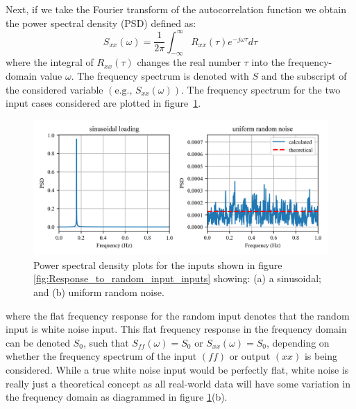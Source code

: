 \documentclass[12pt,letter]{article}
\numberwithin{ex}{section} %
\numberwithin{re}{section} %
\begin{document}
Next, if we take the Fourier transform of the autocorrelation function we obtain the power spectral density (PSD) defined as:
\begin{equation}
S_{xx}(\omega) =\frac{1}{2 \pi} \int_{-\infty}^{\infty} R_{xx}(\tau) e^{-j \omega \tau}d \tau
\end{equation}
where the integral of $R_{xx}(\tau)$ changes the real number $\tau$ into the frequency-domain value $\omega$. The frequency spectrum is denoted with $S$ and the subscript of the considered variable $(\text{e.g., }S_{xx}(\omega))$.  The frequency spectrum for the two input cases considered are plotted in figure~\ref{fig:Response_to_random_input_PSD}.
\begin{figure}[H]
	\centering
	\includegraphics[width=1\textwidth]{../Figures/Response_to_random_input_PSD.png}
	\caption{Power spectral density plots for the inputs shown in figure \ref{fig:Response_to_random_input_inputs} showing: (a) a sinusoidal; and (b) uniform random noise.}
	\label{fig:Response_to_random_input_PSD}
\end{figure}
\noindent where the flat frequency response for the random input denotes that the random input is white noise input.  This flat frequency response in the frequency domain can be denoted $S_0$, such that $S_{ff}(\omega) = S_0$ or $S_{xx}(\omega) = S_0$, depending on whether the frequency spectrum of the input $(ff)$ or output  $(xx)$ is being considered. While a true white noise input would be perfectly flat, white noise is really just a theoretical concept as all real-world data will have some variation in the frequency domain as diagrammed in figure \ref{fig:Response_to_random_input_PSD}(b). 
\end{document}
